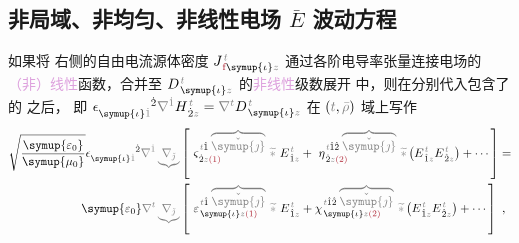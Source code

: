 \subsection{非局域、非均匀、非线性电场 $\bar{E}$ 波动方程}\label{ssec:Exp-waveq}

如果将  右侧的自由电流源体密度 $J^{\;\!\mathcolor{gray}{t}}_{\;\! \textcolor{Maroon}{\text{f}} \symup{\iota}\mathcolor{gray}{z}}$ 通过各阶电导率张量连接电场的\textcolor{Plum}{（非）线性}函数，合并至 $D^{\;\!\mathcolor{gray}{t}}_{\;\! \symup{\iota}\mathcolor{gray}{z}}$ 的\textcolor{Plum}{非线性}级数展开  中，则在分别代入包含了  的  之后， 即 $\epsilon^{\hphantom{\symup{\iota}\dot{1}}\dot{2}}_{\symup{\iota}\mathcolor{gray}{\dot{1}}} \mathcolor{gray}{\nabla^{\dot{1}}} H^{\;\!\mathcolor{gray}{t}}_{\;\! \dot{2}\mathcolor{gray}{z}} = \mathcolor{gray}{\nabla^t} D^{\;\!\mathcolor{gray}{t}}_{\;\! \symup{\iota}\mathcolor{gray}{z}}$ 在 $\left( \mathcolor{gray}{t}, \mathcolor{gray}{\bar{\rho}} \right)$ 域上写作
\clearpage
\vspace*{-4.5em}
\begin{subequations}
\begin{align}
	\sqrt{\frac{\symup{\varepsilon_0}}{\symup{\mu_0}}} \epsilon^{\hphantom{\symup{\iota}\dot{1}}\dot{2}}_{\symup{\iota}\mathcolor{gray}{\dot{1}}} \mathcolor{gray}{\nabla^{\dot{1}}} \mathcolor{gray}{\underbrace{\nabla_{\check{\jmath}}}} &\left[~ \varsigma^{\;\! \mathcolor{gray}{t} \hat{1} \;\! \mathcolor{gray}{\overbrace{\check{\symup{\jmath}}}}}_{\;\! \dot{2} \mathcolor{gray}{z} \textcolor{Maroon}{(1)}} ~\mathcolor{gray}{\widetilde *}~ E^{\;\!\mathcolor{gray}{t}}_{\;\! \hat{1} \mathcolor{gray}{z}} + ~\eta^{\;\! \mathcolor{gray}{t} \hat{1} \hat{2} \;\! \mathcolor{gray}{\overbrace{\check{\symup{\jmath}}}}}_{\;\! \dot{2} \mathcolor{gray}{z} \textcolor{Maroon}{(2)}} ~\mathcolor{gray}{\widetilde *} \left( E^{\;\!\mathcolor{gray}{t}}_{\;\! \hat{1} \mathcolor{gray}{z}} E^{\;\!\mathcolor{gray}{t}}_{\;\! \hat{2} \mathcolor{gray}{z}} \right) + \cdots \right] \label{eq:wave_trho} = \\
	{\symup{\varepsilon_0}} \mathcolor{gray}{\nabla^t} \mathcolor{gray}{\underbrace{\nabla_{\check{\jmath}}}} &\left[~ \varepsilon^{\;\! \mathcolor{gray}{t} \hat{1} \;\! \mathcolor{gray}{\overbrace{\check{\symup{\jmath}}}}}_{\;\! \symup{\iota} \mathcolor{gray}{z} \textcolor{Maroon}{(1)}} ~\mathcolor{gray}{\widetilde *}~ E^{\;\!\mathcolor{gray}{t}}_{\;\! \hat{1} \mathcolor{gray}{z}} + \chi^{\;\! \mathcolor{gray}{t} \hat{1} \hat{2} \;\! \mathcolor{gray}{\overbrace{\check{\symup{\jmath}}}}}_{\;\! \symup{\iota} \mathcolor{gray}{z} \textcolor{Maroon}{(2)}} ~\mathcolor{gray}{\widetilde *} \left( E^{\;\!\mathcolor{gray}{t}}_{\;\! \hat{1} \mathcolor{gray}{z}} E^{\;\!\mathcolor{gray}{t}}_{\;\! \hat{2} \mathcolor{gray}{z}} \right) + \cdots \right]~,
\end{align}
\end{subequations}

